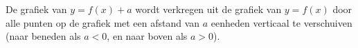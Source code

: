 \begin{figure}[h]
	
\end{figure}



De grafiek van $y=f(x)+a$ wordt verkregen uit de grafiek
van $y=f(x)$ door alle punten op de grafiek met een afstand van $a$
eenheden verticaal te verschuiven (naar beneden als $a<0$, en naar
boven als $a>0$).

\begin{figure}[h]
	
\end{figure}


\begin{figure}[h]
	
\end{figure}







